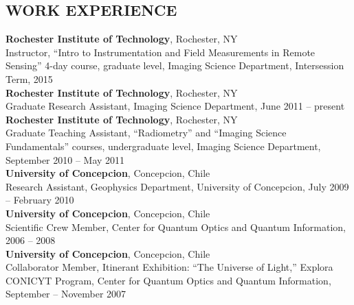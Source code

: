 \documentclass[11pt]{res} %
\begin{document}
\begin{resume}
\vspace{-0.1in}
\section{WORK EXPERIENCE}
\vspace{0.1in}
{\bf Rochester Institute of Technology}, Rochester, NY\\
Instructor, ``Intro to Instrumentation and Field Measurements in Remote Sensing'' 4-day course, graduate level, Imaging Science Department, Intersession Term, 2015
\vspace{0.1in}\\
{\bf Rochester Institute of Technology}, Rochester, NY\\
Graduate Research Assistant, Imaging Science Department, June 2011 -- present
\vspace{0.1in}\\
{\bf Rochester Institute of Technology}, Rochester, NY\\
Graduate Teaching Assistant, ``Radiometry'' and  ``Imaging Science Fundamentals'' courses, undergraduate level, Imaging Science Department, September 2010 -- May 2011
\vspace{0.1in}\\
{\bf University of Concepcion}, Concepcion, Chile\\
Research Assistant, Geophysics Department, University of Concepcion, July 2009 -- February 2010
\vspace{-0.1in}\\
{\bf University of Concepcion}, Concepcion, Chile\\
Scientific Crew Member, Center for Quantum Optics and Quantum Information, 2006 -- 2008
\vspace{0.1in}\\
{\bf University of Concepcion}, Concepcion, Chile\\
Collaborator Member, Itinerant Exhibition: ``The Universe of Light,'' Explora CONICYT Program, Center for Quantum Optics and Quantum Information, September -- November 2007\\

\vspace{-0.1in}

\end{resume}
\end{document}
